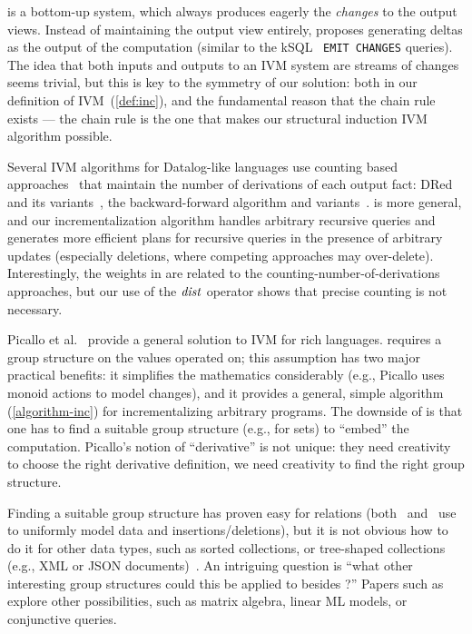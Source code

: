 \dbsp is a bottom-up system, which always produces eagerly
the \emph{changes} to the output views.
Instead of maintaining the output view entirely, \dbsp proposes
generating deltas as the output of the computation (similar to the kSQL~\cite{jafarpour-edbt19}
\texttt{EMIT CHANGES} queries).  The idea that both
inputs and outputs to an IVM system are streams of changes
seems trivial, but this is key to the symmetry of our solution:
both in our definition of IVM~(\ref{def:inc}), and the fundamental
reason that the chain rule exists --- the chain rule is the one that makes our
structural induction IVM algorithm possible.

Several IVM algorithms for Datalog-like languages use counting based
approaches~\cite{Dewan-iis92,motik-aaai15} that maintain the number of
derivations of each output fact: DRed~\cite{gupta-sigmod93} and its
variants~\cite{Ceri-VLDB91,Wolfson-sigmod91,Staudt-vldb96,Kotowski-rr11,Lu-sigmod95,Apt-sigmod87},
the backward-forward algorithm and
variants~\cite{motik-aaai15,Harrison-wdd92,motik-ai19}.  \dbsp is more
general, and our incrementalization algorithm handles arbitrary
recursive queries and generates more efficient plans for recursive
queries in the presence of arbitrary updates (especially deletions,
where competing approaches may over-delete).  Interestingly, the \zrs
weights in \dbsp are related to the counting-number-of-derivations
approaches, but our use of the $\mathit{dist}$ operator shows that precise
counting is not necessary.

Picallo et al.~\cite{picallo-scop19} provide a general solution to IVM for
rich languages.  \dbsp requires a group structure on the values operated on;
this assumption has two major practical benefits: it simplifies the mathematics considerably
(e.g., Picallo uses monoid actions to model changes), and it provides a general, simple
algorithm (\ref{algorithm-inc}) for incrementalizing arbitrary programs.  The downside of
\dbsp is that one has to find a suitable group structure (e.g., \zrs for sets) to ``embed''
the computation.  Picallo's notion of ``derivative'' is not unique: they need creativity to choose
the right derivative definition, we need creativity to find the right group structure.

Finding a suitable group structure has proven easy for relations (both~\cite{koch-pods10}
and~\cite{green-tcs11} use \zrs to uniformly model data and insertions/deletions), but it is
not obvious how to do it for other data types, such as sorted collections, or tree-shaped
collections (e.g., XML or JSON documents)~\cite{foster-planx08}.  An intriguing question
is ``what other interesting group structures could this be applied to besides \zrs?''
Papers such as~\cite{nikolic-icmd18} explore other possibilities, such as matrix algebra,
linear ML models, or conjunctive queries.

